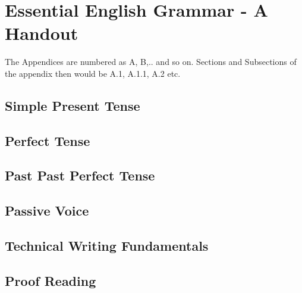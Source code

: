 \chapter{Essential English Grammar - A Handout}\label{app:insset}
The Appendices are numbered as A, B,.. and so on. Sections and Subsections of the appendix then would be A.1, A.1.1, A.2 etc.  

\section{Simple Present Tense}
\section{Perfect Tense}
\section{Past Past Perfect Tense}
\section{Passive Voice}

\section{Technical Writing Fundamentals}

\section{Proof Reading}



